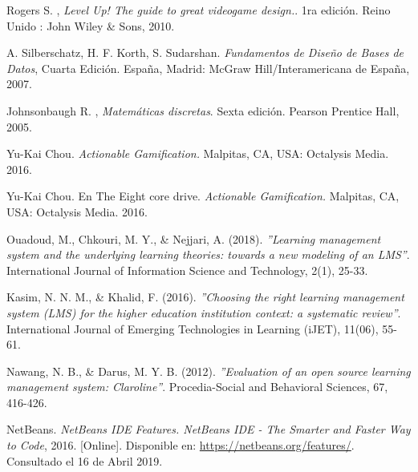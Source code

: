 \begin{thebibliography}{9}
        Rogers S. , \textit{Level Up! The guide to great videogame design.}. 1ra edición. Reino Unido : John Wiley \& Sons, 2010.

        A. Silberschatz, H. F. Korth, S. Sudarshan. \textit{Fundamentos de Diseño de Bases de Datos}, Cuarta Edición. España, Madrid: McGraw Hill/Interamericana de España,  2007.

        Johnsonbaugh R. , \textit{Matemáticas discretas}. Sexta edición. Pearson Prentice Hall, 2005.

        Yu-Kai Chou.
        \textit{Actionable Gamification.}
        Malpitas, CA, USA: Octalysis Media. 2016.


        Yu-Kai Chou.
        En The Eight core drive.
        \textit{Actionable Gamification.}
        Malpitas, CA, USA: Octalysis Media. 2016.

        Ouadoud, M., Chkouri, M. Y., \& Nejjari, A. (2018). {\it''Learning management system and the underlying learning theories: towards a new modeling of an LMS''}. International Journal of Information Science and Technology, 2(1), 25-33.

        Kasim, N. N. M., \& Khalid, F. (2016). {\it''Choosing the right learning management system (LMS) for the higher education institution context: a systematic review''}. International Journal of Emerging Technologies in Learning (iJET), 11(06), 55-61.

        Nawang, N. B., \& Darus, M. Y. B. (2012). {\it''Evaluation of an open source learning management system: Claroline''}. Procedia-Social and Behavioral Sciences, 67, 416-426.




        NetBeans. {\it NetBeans IDE Features. NetBeans IDE - The Smarter and Faster Way to Code}, 2016. [Online]. Disponible en: \url{https://netbeans.org/features/}. Consultado el 16 de Abril 2019.


\end{thebibliography}
